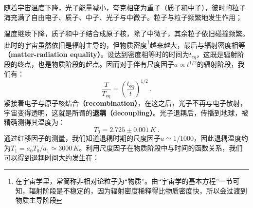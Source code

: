 随着宇宙温度下降，光子能量减小，夸克相变为重子（质子和中子），彼时的粒子海充满了自由电子、质子、中子、光子与中微子。粒子与粒子频繁地发生作用；

温度继续下降，质子和中子结合成原子核，除了中微子，其余粒子依旧碰撞频繁。此时的宇宙虽然依旧是辐射主导的，但物质密度\footnote{在宇宙学里，常简称非相对论粒子为“物质”。由“宇宙学的基本方程”一节可知，辐射阶段是不稳定的，因为辐射密度稀释得比物质密度快，所以会过渡到物质主导阶段}越来越大，最后与辐射密度相等\textbf{（matter-radiation equality）}。设达到密度相等时的时间为$t_{eq}$，这既是辐射阶段的终点，也是物质阶段的起点。因而对于伴有尺度因子$a\propto t^{1/2}$的辐射阶段，我们有：
\begin{equation}
\frac T{T_\mathrm{eq}}=\left(\frac{t_\mathrm{eq}}t\right)^{1/2}~.
\end{equation}
紧接着电子与原子核结合\textbf{（recombination）}，在这之后，光子不再与电子散射，宇宙变得透明，这就是所谓的\textbf{退耦（decoupling）}。光子退耦后，传播到地球，被精确测得其温度为：
\begin{equation}
T_{0}=2.725 \pm 0.001 \,K~.
\end{equation}
通过红移因子的测量，我们知道退耦时期的尺度因子$a\simeq 1/1000$，因此退耦温度约为$T_1=a_0T_0/{a_1}\simeq 3000\,K$。利用尺度因子在物质阶段中与时间的函数关系，我们可以得到退耦时间大约发生在：



